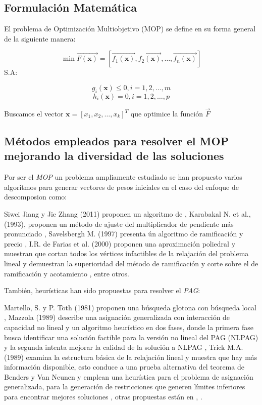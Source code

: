 \documentclass[letterpaper,10pt]{article}
\begin{document}
\newpage
\subsection{Formulación Matemática}
El problema de Optimización Multiobjetivo (MOP) se define en su forma general de la siguiente manera:
 
$$\min \overrightarrow{F(\bm{x})} = \left[ \overrightarrow{f_1(\bm{x})}, \overrightarrow{f_2(\bm{x})} , \dots, \overrightarrow{f_n(\bm{x})} \right] $$
S.A:
 
$$g_i(\bm{x}) \leq 0, i=1,2,\dots,m$$
$$h_i(\bm{x}) = 0, i=1,2,\dots,p$$
 
Buscamos el vector $\bm{x}=[x_1,x_2,\dots,x_k]^T$ que optimice la función $\overrightarrow{F}$

 
\subsection{Métodos empleados para resolver el MOP mejorando la diversidad de las soluciones}

Por ser el \emph{MOP} un problema ampliamente estudiado se han propuesto varios algoritmos para generar vectores de pesos iniciales en el caso del enfoque de descomposion como:
\newline

Siwei Jiang y Jie Zhang (2011) proponen un algoritmo de  \cite{mie99}, Karabakal N. et al., (1993), proponen un método de ajuste del multiplicador de pendiente más pronunciado \cite{4358754}, Savelsbergh M. (1997) presenta ún algoritmo de ramificación y precio \cite{4358754}, I.R. de Farias et al. (2000) proponen una aproximación poliedral y muestran que cortan todos los vértices infactibles de la relajación del problema lineal y demuestran la superioridad del método de ramificación y corte sobre el de ramificación y acotamiento \cite{4358754}, entre otros.
\newline



También, heurísticas han sido propuestas para resolver el \emph{PAG}:
\newline

Martello, S. y P. Toth (1981) proponen una búsqueda glotona con búsqueda local \cite{4358754}, Mazzola (1989) describe una asignación generalizada con interacción de capacidad no lineal y un algoritmo heurístico en dos fases, donde la primera fase busca identificar una solución factible para la versión no lineal del PAG (NLPAG) y la segunda intenta mejorar la calidad de la solución a NLPAG  \cite{4358754}, Trick M.A. (1989) examina la estructura básica de la relajación lineal y muestra que hay más información disponible, esto conduce a una prueba alternativa del teorema de Benders y Van Neunen y emplean una heurística para el problema de asignación generalizada, para la generación de restricciones que generen límites inferiores para encontrar mejores soluciones \cite{4358754}, otras propuestas están en \cite{4358754}, \cite{4358754}.     
\newline
\end{document}
